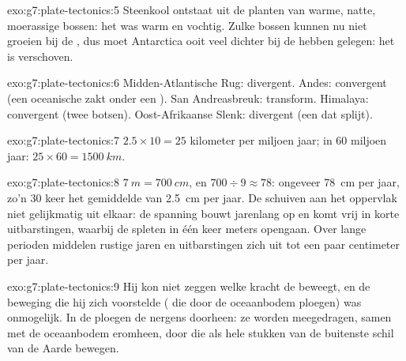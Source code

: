 \begin{solution}{exo:g7:plate-tectonics:5}
Steenkool ontstaat uit de planten van warme, natte, moerassige bossen: het
 was warm en vochtig. Zulke bossen kunnen nu niet groeien bij de
, dus moet Antarctica ooit veel dichter bij de  hebben
gelegen: het is verschoven.
\end{solution}

\begin{solution}{exo:g7:plate-tectonics:6}
Midden-Atlantische Rug: divergent. Andes: convergent (een oceanische 
zakt onder een ). San Andreasbreuk: transform. Himalaya:
convergent (twee  botsen). Oost-Afrikaanse Slenk: divergent (een
 dat splijt).
\end{solution}

\begin{solution}{exo:g7:plate-tectonics:7}
$2.5 \times 10 = 25$ kilometer per miljoen jaar; in 60 miljoen jaar:
$25 \times 60 = \qty{1500}{km}$.
\end{solution}

\begin{solution}{exo:g7:plate-tectonics:8}
$\qty{7}{m} = \qty{700}{cm}$, en $700 \div 9 \approx 78$: ongeveer
\qty{78}{cm} per jaar, zo'n 30 keer het gemiddelde van \qty{2.5}{cm} per
jaar. De  schuiven aan het oppervlak niet gelijkmatig uit elkaar: de
spanning bouwt jarenlang op en komt vrij in korte uitbarstingen, waarbij
de spleten in één keer meters opengaan. Over lange perioden middelen rustige
jaren en uitbarstingen zich uit tot een paar centimeter per jaar.
\end{solution}

\begin{solution}{exo:g7:plate-tectonics:9}
Hij kon niet zeggen welke kracht de  beweegt, en de beweging
die hij zich voorstelde ( die door de oceaanbodem ploegen) was
onmogelijk. In de  ploegen de  nergens doorheen:
ze worden meegedragen, samen met de oceaanbodem eromheen, door  die
als hele stukken van de buitenste schil van de Aarde bewegen.
\end{solution}

